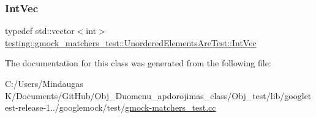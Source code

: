 \subsubsection{\texorpdfstring{IntVec}{IntVec}}
{\footnotesize\ttfamily typedef std\+::vector$<$int$>$ \mbox{\hyperlink{classtesting_1_1gmock__matchers__test_1_1_unordered_elements_are_test_a608750c71652943bd11fe7bb5281588d}{testing\+::gmock\+\_\+matchers\+\_\+test\+::\+Unordered\+Elements\+Are\+Test\+::\+Int\+Vec}}\hspace{0.3cm}{\ttfamily [protected]}}



The documentation for this class was generated from the following file\+:\begin{DoxyCompactItemize}
\item 
C\+:/\+Users/\+Mindaugas K/\+Documents/\+Git\+Hub/\+Obj\+\_\+\+Duomenu\+\_\+apdorojimas\+\_\+class/\+Obj\+\_\+test/lib/googletest-\/release-\/1../googlemock/test/\mbox{\hyperlink{_obj__test_2lib_2googletest-release-1_88_81_2googlemock_2test_2gmock-matchers__test_8cc}{gmock-\/matchers\+\_\+test.\+cc}}\end{DoxyCompactItemize}
